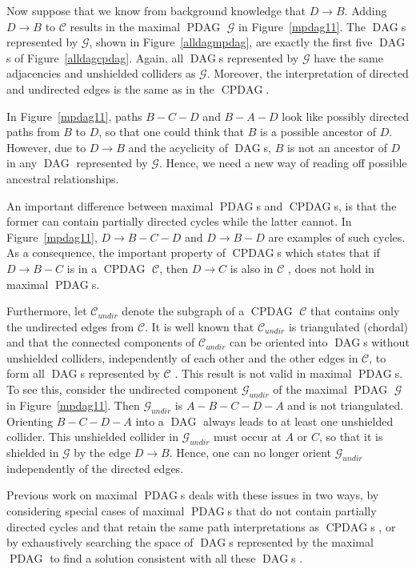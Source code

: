 \documentclass[letterpaper]{article}
\theoremstyle{definition}
\theoremstyle{remark}
\DeclareMathOperator{\PDAG}{PDAG}
\DeclareMathOperator{\CPDAG}{CPDAG}
\DeclareMathOperator{\DAG}{DAG}
\newcommand{\mpdag}{maximal $\PDAG$}
\newcommand{\g}[1][G]{\mathcal{#1}}
\begin{document}
Now suppose that we know from background knowledge that $D \rightarrow B$.
Adding $D \rightarrow B$ to $\g[C]$ results in the \mpdag{} $\g$ in Figure~\ref{mpdag11}. The $\DAG$s represented by $\g$, shown in Figure~\ref{alldagmpdag}, are exactly the first five $\DAG$s of Figure~\ref{alldagcpdag}. Again, all $\DAG$s represented by $\g$ have the same adjacencies and unshielded colliders as $\g$. Moreover, the interpretation of directed and undirected edges is the same as in the $\CPDAG$. 

In Figure~\ref{mpdag11}, paths $B - C - D$ and $B - A - D$ look like possibly directed paths from $B$ to $D$, so that one could think that $B$ is a possible ancestor of $D$.
However, due to $D \rightarrow B$ and the acyclicity of $\DAG$s, $B$ is not an ancestor of $D$ in any $\DAG$ represented by $\g$. Hence, we need a new way of reading off possible ancestral relationships.

An important difference between \mpdag{}s and $\CPDAG$s, is that the former can contain partially directed cycles while the latter cannot.
In Figure~\ref{mpdag11}, $D \rightarrow B -C-D$ and $D\rightarrow B -D$ are examples of such cycles. As a consequence, the important property of $\CPDAG$s which states that if $D \rightarrow B - C$ is in a $\CPDAG$ $\g[C]$, then $D \rightarrow C$ is also in $\g[C]$ \citep[Lemma 1 from][]{meek1995causal}, does not hold in \mpdag{}s.

Furthermore, let $\g[C]_{undir}$ denote the subgraph of a $\CPDAG$ $\g[C]$ that contains only the undirected edges from $\g[C]$. It is well known that $\g[C]_{undir}$ is triangulated (chordal) and that the connected components of $\g[C]_{undir}$ can be oriented into $\DAG$s without unshielded colliders, independently of each other and the other edges in $\g[C]$, to form all $\DAG$s represented by $\g[C]$ \citep[see the proof of Theorem 4 in][]{meek1995causal}. This result is not valid in \mpdag{}s. To see this, consider the undirected component $\g_{undir}$ of the \mpdag{} $\g$ in Figure~\ref{mpdag11}. Then $\g_{undir}$ is $A -B-C-D-A$ and is not triangulated. Orienting $B-C-D-A$ into a $\DAG$ always leads to at least one unshielded collider. This unshielded collider in $\g_{undir}$ must occur at $A$ or $C$, so that it is shielded in $\g$ by the edge $D\to B$. Hence, one can no longer orient $\g_{undir}$ independently of the directed edges. 

Previous work on \mpdag{}s deals with these issues in two ways, by considering special cases of \mpdag{}s that do not contain partially directed cycles and that retain the same path interpretations as $\CPDAG$s \citep{vanDerZander16}, or by exhaustively searching the space of $\DAG$s represented by the \mpdag{} to find a solution consistent with all these $\DAG$s \citep{hyttinen2015calculus}. 
\end{document}
